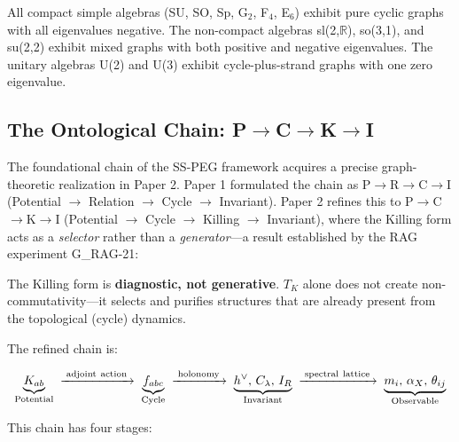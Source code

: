 All compact simple algebras (SU, SO, Sp, G$_2$, F$_4$, E$_6$) exhibit pure cyclic graphs with all eigenvalues negative. The non-compact algebras sl(2,$\mathbb{R}$), so(3,1), and su(2,2) exhibit mixed graphs with both positive and negative eigenvalues. The unitary algebras U(2) and U(3) exhibit cycle-plus-strand graphs with one zero eigenvalue.

\subsection{The Ontological Chain: P$\to$C$\to$K$\to$I}\label{sec:onological_chain}

The foundational chain of the SS-PEG framework acquires a precise graph-theoretic realization in Paper 2. Paper 1 formulated the chain as P$\to$R$\to$C$\to$I (Potential $\to$ Relation $\to$ Cycle $\to$ Invariant). Paper 2 refines this to P$\to$C$\to$K$\to$I (Potential $\to$ Cycle $\to$ Killing $\to$ Invariant), where the Killing form acts as a \emph{selector} rather than a \emph{generator}---a result established by the RAG experiment G\_RAG-21:

\begin{theorem}[G\_RAG-21]\label{th:g_rag_21}
The Killing form is \textbf{diagnostic, not generative}. $T_K$ alone does not create non-commutativity---it selects and purifies structures that are already present from the topological (cycle) dynamics.
\end{theorem}

The refined chain is:

\begin{equation}
\underbrace{K_{ab}}_{\text{Potential}} \;\xrightarrow{\;\mathrm{adjoint\ action}\;}\; \underbrace{f_{abc}}_{\text{Cycle}} \;\xrightarrow{\;\mathrm{holonomy}\;}\; \underbrace{h^\vee, \, C_\lambda, \, I_R}_{\text{Invariant}} \;\xrightarrow{\;\mathrm{spectral\ lattice}\;}\; \underbrace{m_i, \, \alpha_X, \, \theta_{ij}}_{\text{Observable}}
\end{equation}

This chain has four stages:

